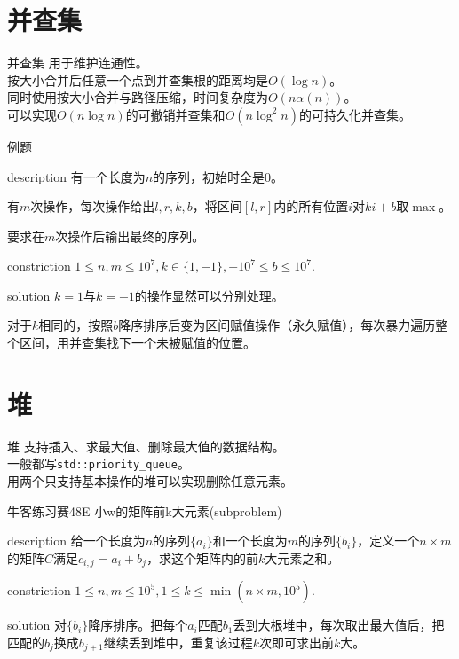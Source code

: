 \documentclass{beamer}
\begin{document}
	\section{并查集}
	\begin{frame}{并查集}
			用于维护连通性。\\
			
			按大小合并后任意一个点到并查集根的距离均是$O(\log n)$。\\
			
			同时使用按大小合并与路径压缩，时间复杂度为$O(n\alpha(n))$。\\
			
			可以实现$O(n\log n)$的可撤销并查集和$O(n\log^2n)$的可持久化并查集。
	\end{frame}
	\begin{frame}{例题}
		\begin{block}{description}
			有一个长度为$n$的序列，初始时全是$0$。
			
			有$m$次操作，每次操作给出$l,r,k,b$，将区间$[l,r]$内的所有位置$i$对$ki+b$取$\max$。
			
			要求在$m$次操作后输出最终的序列。
		\end{block}
		\begin{block}{constriction}
			$1 \le n, m \le 10^7, k \in\{1,-1\}, -10^7 \le b \le 10^7.$
		\end{block}
		\pause
		\begin{block}{solution}
			$k=1$与$k=-1$的操作显然可以分别处理。
			
			对于$k$相同的，按照$b$降序排序后变为区间赋值操作（永久赋值），每次暴力遍历整个区间，用并查集找下一个未被赋值的位置。
		\end{block}
	\end{frame}
	\section{堆}
	\begin{frame}{堆}
		支持插入、求最大值、删除最大值的数据结构。\\
		
		一般都写\texttt{std::priority\_queue}。\\
		
		用两个只支持基本操作的堆可以实现删除任意元素。
	\end{frame}
	\begin{frame}{牛客练习赛48E 	小w的矩阵前k大元素(subproblem)}
		\begin{block}{description}
			给一个长度为$n$的序列$\{a_i\}$和一个长度为$m$的序列$\{b_i\}$，定义一个$n \times m$的矩阵$C$满足$c_{i,j}=a_i+b_j$，求这个矩阵内的前$k$大元素之和。
		\end{block}
		\begin{block}{constriction}
			$1 \le n,m \le 10^5, 1 \le k \le \min(n\times m, 10^5).$
		\end{block}
		\pause
		\begin{block}{solution}
			对$\{b_i\}$降序排序。把每个$a_i$匹配$b_1$丢到大根堆中，每次取出最大值后，把匹配的$b_j$换成$b_{j+1}$继续丢到堆中，重复该过程$k$次即可求出前$k$大。
			
			
		\end{block}
	\end{frame}
\end{document}
